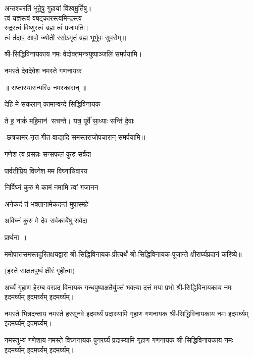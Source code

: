 \begin{center}
अन्तश्चरति॑ भूते॒षु॒ गुहायां वि॑श्वमू॒र्तिषु। \\
त्वं यज्ञस्त्वं वषट्कारस्त्वमिन्द्रस्त्व\\ रुद्रस्त्वं विष्णुस्त्वं ब्रह्म त्वं॑ प्रजा॒पतिः। \\
त्वं त॑दाप॒ आपो॒ ज्योती॒ रसो॒ऽमृतं॒ ब्रह्म॒ भूर्भुवः॒ सुव॒रोम्‌॥\medskip

\medskip

श्री-सिद्धिविनायकाय नमः वेदोक्तमन्त्रपुष्पाञ्जलिं समर्पयामि।\medskip

{नमस्ते देवदेवेश नमस्ते गणनायक} 

॥ सप्तास्यासन्परि० नमस्कारान् ॥ 

{देहि मे सकलान् कामान्वन्दे सिद्धिविनायक} 

{ते ह॒ नाकं॑ महि॒मान॑ सचन्ते। यत्र॒ पूर्वे॑ सा॒ध्याः सन्ति॑ दे॒वाः}

-छत्रचामर-नृत्त-गीत-वाद्यादि समस्तराजोपचारान् समर्पयामि॥\medskip

{गणेश त्वं प्रसन्नः सन्सफलं कुरु सर्वदा}

{पार्वतीप्रिय विघ्नेश मम विघ्नान्निवारय} 

{निर्विघ्नं कुरु मे कामं नमामि त्वां गजानन}

{अनेकदं तं भक्तानामेकदन्तं मुपास्महे}

{अविघ्नं कुरु मे देव सर्वकार्येषु सर्वदा}

प्रार्थना ॥

\resetShloka
ममोपात्तसमस्तदुरितक्षयद्वारा श्री-सिद्धिविनायक-प्रीत्यर्थं श्री-सिद्धिविनायक-पूजान्ते क्षीरार्घ्यप्रदानं करिष्ये॥

(हस्ते साक्षतपुष्पं क्षीरं गृहीत्वा)

\twolineshloka
{अर्घ्यं गृहाण हेरम्ब वरप्रद विनायक}
{गन्धपुष्पाक्षतैर्युक्तं भक्त्या दत्तं मया प्रभो}
श्री-सिद्धिविनायकाय नमः इदमर्घ्यम् इदमर्घ्यम् इदमर्घ्यम्।

\twolineshloka
{नमस्ते भिन्नदन्ताय नमस्ते हरसूनवे}
{इदमर्घ्यं प्रदास्यामि गृहाण गणनायक}
श्री-सिद्धिविनायकाय नमः इदमर्घ्यम् इदमर्घ्यम् इदमर्घ्यम्।

\twolineshloka
{नमस्तुभ्यं गणेशाय नमस्ते विघ्ननायक}
{पुनरर्घ्यं प्रदास्यामि गृहाण गणनायक}
श्री-सिद्धिविनायकाय नमः इदमर्घ्यम् इदमर्घ्यम् इदमर्घ्यम्।


\end{center}
